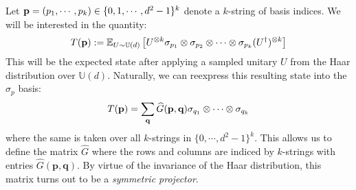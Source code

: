 \documentclass[12pt]{amsart}
\theoremstyle{definition}
\theoremstyle{remark}
\numberwithin{equation}{section}
\theoremstyle{remark}
\begin{document}
\noindent Let ${\bf p} = (p_1, \cdots, p_k) \in \{0,1,\cdots, d^2 -1\}^k$ denote a $k$-string of basis indices. We will be interested in the quantity:
%
\begin{equation} \label{Tdef}
  T({\bf p}) := \mathbb{E}_{U \sim \mathbb{U}(d)} \left[ U^{\otimes k} \sigma_{p_1} \otimes \sigma_{p_2} \otimes \cdots \otimes \sigma_{p_k} (U^\dagger)^{\otimes k} \right]
\end{equation}
This will be the expected state after applying a sampled unitary $U$ from the Haar distribution over $\mathbb{U}(d)$. Naturally, we can reexpress this resulting state into the $\sigma_p$ basis:
%
\begin{equation}
  T({\bf p}) = \sum_{{\bf q}} \widehat{G}(\textbf{p},\textbf{q}) \sigma_{q_1} \otimes \cdots \otimes \sigma_{q_k}
\end{equation}
where the same is taken over all $k$-strings in $\{0, \cdots, d^2-1\}^k$. This allows us to define the matrix $\widehat{G}$ where the rows and columns are indiced by $k$-strings with entries $\widehat{G}(\textbf{p},\textbf{q})$. By virtue of the invariance of the Haar distribution, this matrix turns out to be a \emph{symmetric projector}.
\end{document}
